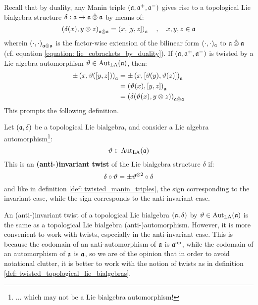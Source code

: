         Recall that by duality, any Manin triple $(\mathfrak{a}, \mathfrak{a}^+, \mathfrak{a}^-)$ gives rise to a topological Lie bialgebra structure $\delta: \a \to \a \hattensor \a$ by means of:
            $$\left( \delta(x), y \tensor z \right)_{\a \hattensor \a} = \left( x, [y, z] \right)_{\a} \quad, \quad x, y, z \in \a$$
        wherein $(\cdot, \cdot)_{\a \hattensor \a}$ is the factor-wise extension of the bilinear form $(\cdot, \cdot)_{\mathfrak{a}}$ to $\a \hattensor \a$ (cf. equation \eqref{equation: lie_cobrackets_by_duality}). If $(\mathfrak{a}, \mathfrak{a}^+, \mathfrak{a}^-)$ is twisted by a Lie algebra automorphism $\vartheta \in \operatorname{Aut}_{\mathrm{LA}}(\mathfrak{a})$, then:
            \begin{equation} \label{equation: twisting_lie_bialgebras_by_duality}
                \begin{aligned}
                    \pm \left( x, \vartheta([y, z]) \right)_{\a} & = \pm \left( x, [\vartheta(y), \vartheta(z)] \right)_{\a}
                    \\
                    & = \left( \vartheta(x), [y, z] \right)_{\a}
                    \\
                    & = \left( \delta( \vartheta(x), y \tensor z ) \right)_{\a \hattensor \a}
                \end{aligned}
            \end{equation}
        This prompts the following definition.
        \begin{definition} \label{def: twisted_topological_lie_bialgebras}
            Let $(\mathfrak{a}, \delta)$ be a topological Lie bialgebra, and consider a Lie algebra automorphism\footnote{... which may not be a Lie bialgebra automorphism!}:
                $$\vartheta \in \operatorname{Aut}_{\mathrm{LA}}(\mathfrak{a})$$
            This is an \textbf{(anti-)invariant twist} of the Lie bialgebra structure $\delta$ if:
                $$\delta \circ \vartheta = \pm \vartheta^{\tensor 2} \circ \delta$$
            and like in definition \ref{def: twisted_manin_triples}, the \say{$+$} sign corresponding to the invariant case, while the \say{$-$} sign corresponds to the anti-invariant case.
        \end{definition}
        \begin{remark}
            An (anti-)invariant twist of a topological Lie bialgebra $(\mathfrak{a}, \delta)$ by $\vartheta \in \operatorname{Aut}_{\mathrm{LA}}(\mathfrak{a})$ is the same as a topological Lie bialgebra (anti-)automorphism. However, it is more convenient to work with twists, especially in the anti-invariant case. This is because the codomain of an anti-automorphism of $\mathfrak{a}$ is $\mathfrak{a}^{\mathrm{op}}$, while the codomain of an automorphism of $\mathfrak{a}$ is $\mathfrak{a}$, so we are of the opinion that in order to avoid notational clutter, it is better to work with the notion of twists as in definition \ref{def: twisted_topological_lie_bialgebras}.
        \end{remark}
